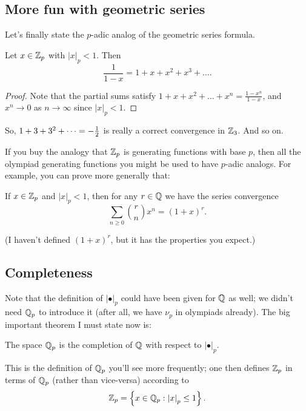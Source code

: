 \subsection{More fun with geometric series}
Let's finally state the $p$-adic analog of the geometric series formula.

\begin{proposition}
	Let $x \in \mathbb Z_p$ with $\left\lvert x \right\rvert_p < 1$.
	Then \[ \frac{1}{1-x} = 1 + x + x^2 + x^3 + \dots. \]
\end{proposition}
\begin{proof}
	Note that the partial sums satisfy
	$1 + x + x^2 + \dots + x^n = \frac{1-x^n}{1-x}$,
	and $x^n \to 0$ as $n \to \infty$ since
	$\left\lvert x \right\rvert_p < 1$.
\end{proof}

So, $1 + 3 + 3^2 + \dots = -\frac{1}{2}$ is really a correct convergence
in $\mathbb Z_3$.
And so on.

If you buy the analogy that $\mathbb Z_p$ is generating functions
with base $p$, then all the olympiad generating functions
you might be used to have $p$-adic analogs.
For example, you can prove more generally that:
\begin{theorem}
	If $x \in \mathbb Z_p$ and $\left\lvert x \right\rvert_p < 1$,
	then for any $r \in \mathbb Q$ we have the series convergence
	\[ \sum_{n \ge 0} \binom rn x^n = (1+x)^r. \]
\end{theorem}
(I haven't defined $(1+x)^r$, but it has the properties you expect.)

\subsection{Completeness}
Note that the definition of $\left\lvert \bullet \right\rvert_p$
could have been given for $\mathbb Q$ as well;
we didn't need $\QQ_p$ to introduce it
(after all, we have $\nu_p$ in olympiads already).
The big important theorem I must state now is:
\begin{theorem}
	[$\QQ_p$ is complete]
	The space $\QQ_p$ is the completion of $\mathbb Q$
	with respect to $\left\lvert \bullet \right\rvert_p$.
\end{theorem}
This is the definition of $\QQ_p$ you'll see more frequently;
one then defines $\mathbb Z_p$ in terms of $\QQ_p$
(rather than vice-versa) according to
\[ \mathbb Z_p = \left\{ x \in \mathbb Q_p :
	\left\lvert x \right\rvert_p \le 1 \right\}. \]

